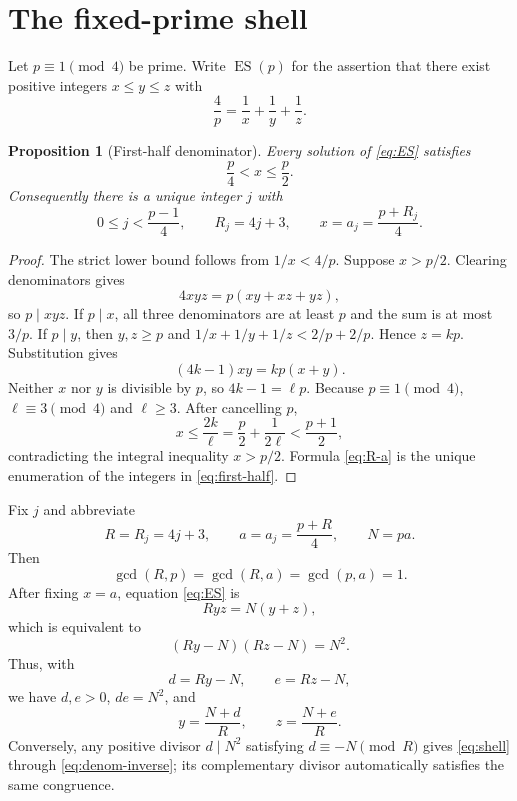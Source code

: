 \documentclass[11pt]{article}
\newtheorem{proposition}[theorem]{Proposition}
\theoremstyle{definition}
\theoremstyle{remark}
\newcommand{\ES}{\operatorname{ES}}
\begin{document}
\section{The fixed-prime shell}

Let $p\equiv1\pmod4$ be prime.  Write $\ES(p)$ for the assertion that there
exist positive integers $x\le y\le z$ with
\begin{equation}\label{eq:ES}
 \frac4p=\frac1x+\frac1y+\frac1z.
\end{equation}

\begin{proposition}[First-half denominator]\label{prop:first-half}
Every solution of \eqref{eq:ES} satisfies
\begin{equation}\label{eq:first-half}
 \frac p4<x\le\frac p2.
\end{equation}
Consequently there is a unique integer $j$ with
\begin{equation}\label{eq:R-a}
 0\le j<\frac{p-1}{4},\qquad
 R_j=4j+3,\qquad
 x=a_j=\frac{p+R_j}{4}.
\end{equation}
\end{proposition}

\begin{proof}
The strict lower bound follows from $1/x<4/p$.  Suppose $x>p/2$.
Clearing denominators gives
\[
 4xyz=p(xy+xz+yz),
\]
so $p\mid xyz$.  If $p\mid x$, all three denominators are at least $p$ and
the sum is at most $3/p$.  If $p\mid y$, then $y,z\ge p$ and
$1/x+1/y+1/z<2/p+2/p$.  Hence $z=kp$.  Substitution gives
\[
 (4k-1)xy=kp(x+y).
\]
Neither $x$ nor $y$ is divisible by $p$, so $4k-1=\ell p$.  Because
$p\equiv1\pmod4$, $\ell\equiv3\pmod4$ and $\ell\ge3$.  After cancelling $p$,
\[
 x\le\frac{2k}{\ell}
 =\frac p2+\frac1{2\ell}<\frac{p+1}{2},
\]
contradicting the integral inequality $x>p/2$.  Formula \eqref{eq:R-a} is the
unique enumeration of the integers in \eqref{eq:first-half}.
\end{proof}

Fix $j$ and abbreviate
\begin{equation}\label{eq:fixed-shell-data}
 R=R_j=4j+3,\qquad a=a_j=\frac{p+R}{4},\qquad N=pa.
\end{equation}
Then
\begin{equation}\label{eq:gcds}
 \gcd(R,p)=\gcd(R,a)=\gcd(p,a)=1.
\end{equation}
After fixing $x=a$, equation \eqref{eq:ES} is
\begin{equation}\label{eq:shell}
 Ryz=N(y+z),
\end{equation}
which is equivalent to
\begin{equation}\label{eq:factor-shell}
 (Ry-N)(Rz-N)=N^2.
\end{equation}
Thus, with
\begin{equation}\label{eq:d-e}
 d=Ry-N,
 \qquad e=Rz-N,
\end{equation}
we have $d,e>0$, $de=N^2$, and
\begin{equation}\label{eq:denom-inverse}
 y=\frac{N+d}{R},\qquad z=\frac{N+e}{R}.
\end{equation}
Conversely, any positive divisor $d\mid N^2$ satisfying
$d\equiv-N\pmod R$ gives \eqref{eq:shell} through
\eqref{eq:denom-inverse}; its complementary divisor automatically satisfies
the same congruence.
\end{document}
